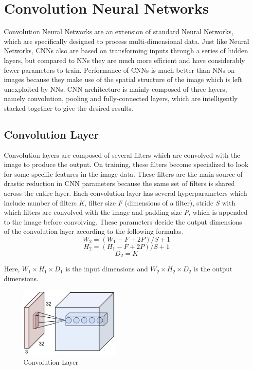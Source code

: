 \documentclass{article} %
\begin{document}
	\section{Convolution Neural Networks}
	Convolution Neural Networks are an extension of standard Neural Networks, which are specifically designed to process multi-dimensional data. Just like Neural Networks, CNNs also are based on transforming inputs through a series of hidden layers, but compared to NNs they are much more efficient and have considerably fewer parameters to train. Performance of CNNs is much better than NNs on images because they make use of the spatial structure of the image which is left unexploited by NNs. CNN architecture is mainly composed of three layers, namely convolution, pooling and fully-connected layers, which are intelligently stacked together to give the desired results.
	
	\subsection{Convolution Layer}
	Convolution layers are composed of several filters which are convolved with the image to produce the output. On training, these filters become specialized to look for some specific features in the image data. These filters are the main source of drastic reduction in CNN parameters because the same set of filters is shared across the entire layer. Each convolution layer has several hyperparameters which include number of filters $K$, filter size $F$ (dimensions of a filter), stride $S$ with which filters are convolved with the image and padding size $P$, which is appended to the image before convolving. These parameters decide the output dimensions of the convolution layer according to the following formulas.
		$$  W_2 = (W_1 - F + 2P)/S + 1 $$
		$$  H_2 = (H_1 - F + 2P)/S + 1 $$
		$$  D_2 = K $$
		
	Here, $ W_1 \times H_1 \times D_1$  is the input dimensions and $ W_2 \times H_2 \times D_2$  is the output dimensions. 
	
	\begin{figure}[h]
		\centering
		\includegraphics[width=5cm]{Images/conv_layer.jpeg}
		\caption{Convolution Layer}
	\end{figure}
\end{document}
